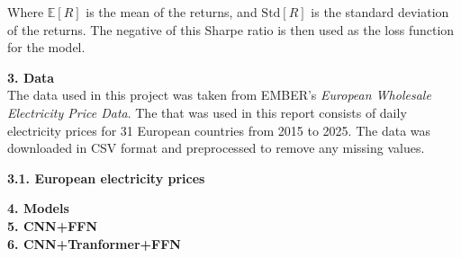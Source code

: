 \documentclass[12pt]{article}
\begin{document}
Where $\mathbb{E}[R]$ is the mean of the returns, and $\text{Std}[R]$ is the standard deviation of the returns. The negative of this Sharpe ratio is then used as the loss function for the model.

\vspace{20pt}

\textbf{3. Data}
\\
The data used in this project was taken from EMBER's \textit{European Wholesale Electricity Price Data}. The that was used in this report consists of daily electricity prices for 31 European countries from 2015 to 2025. The data was downloaded in CSV format and preprocessed to remove any missing values.

\vspace{20pt}

\textbf{3.1. European electricity prices}


\textbf{4. Models}
\\
\textbf{5. CNN+FFN}
\\
\textbf{6. CNN+Tranformer+FFN}
\\
\end{document}

